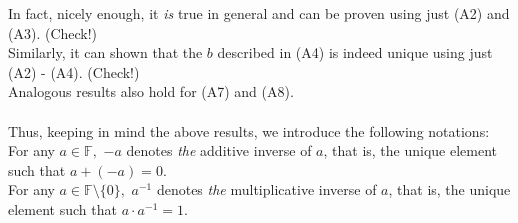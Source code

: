 \documentclass{article}
\begin{document}
In fact, nicely enough, it \emph{is} true in general and can be proven using just (A2) and (A3). (Check!)\\
Similarly, it can shown that the $b$ described in (A4) is indeed unique using just (A2) - (A4). (Check!)\\
Analogous results also hold for (A7) and (A8).\\~\\
Thus, keeping in mind the above results, we introduce the following notations:\\
For any $a \in \mathbb{F},$ $-a$ denotes \emph{the} additive inverse of $a$, that is, the unique element such that $a + (-a) = 0.$\\
For any $a \in \mathbb{F}\setminus\{0\},$ $a^{-1}$ denotes \emph{the} multiplicative inverse of $a$, that is, the unique element such that $a \cdot a^{-1} = 1.$
\end{document}
